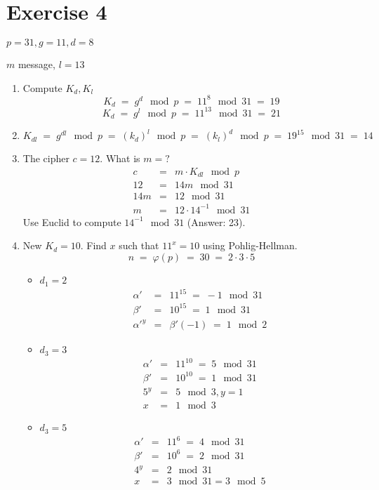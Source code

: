 \documentclass[a4paper]{scrreprt}
\begin{document}
\section*{Exercise 4}

$p=31, g=11, d=8$

$m$ message, $l=13$

\begin{enumerate}
    \item Compute $K_d, K_l$
        \[K_d \;=\; g^d\mod p \;=\; 11^8\mod31 \;=\; 19\]
        \[K_d \;=\; g^l\mod p \;=\; 11^{13}\mod31 \;=\; 21\]
    \item 
        \[K_{dl} \;=\; g^{dl}\mod p \;=\; (k_d)^l\mod p
            \;=\; (k_l)^d\mod p \;=\; 19^{15}\mod 31\;=\;14\]
    \item The cipher $c=12$. What is $m=?$
        \begin{eqnarray*}
            c &=& m\cdot K_{dl}\mod p\\
            12 &=& 14m\mod31\\
            14m &=& 12 \mod31\\
            m &=& 12\cdot 14^{-1}\mod 31
        \end{eqnarray*}
        Use Euclid to compute $14^{-1}\mod31$ (Answer: 23).
    \item New $K_d=10$. Find $x$ such that $11^x=10$ using Pohlig-Hellman.
        \[ n \;=\; \varphi(p) \;=\; 30\;=\;2\cdot3\cdot5 \]
        \begin{itemize}
            \item $d_1=2$
                \begin{eqnarray*}
                    \alpha'&=&11^{15}\;=\;-1\mod 31\\
                    \beta'&=&10^{15}\;=\;1\mod 31\\
                    \alpha'^y &=& \beta'(-1)\;=\;1\mod 2
                \end{eqnarray*}
            \item $d_3=3$
                \begin{eqnarray*}
                    \alpha'&=&11^{10}\;=\;5\mod 31\\
                    \beta'&=&10^{10}\;=\;1\mod 31\\
                    5^y &=& 5\mod 3, y=1\\
                    x &=& 1\mod 3
                \end{eqnarray*}
            \item $d_3=5$
                \begin{eqnarray*}
                    \alpha'&=&11^{6}\;=\;4\mod 31\\
                    \beta'&=&10^{6}\;=\;2\mod 31\\
                    4^y&=&2\mod 31\\
                    x&=& 3\mod 31 = 3\mod 5
                \end{eqnarray*}
        \end{itemize}
\end{enumerate}
\end{document}
